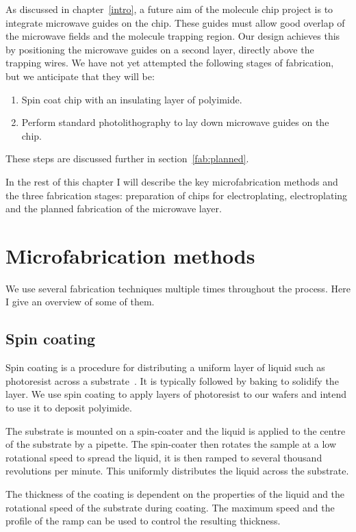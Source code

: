 As discussed in chapter~\ref{intro}, a future aim of the molecule chip project is to
integrate microwave guides on the chip. These guides must allow good overlap of
the microwave fields and the molecule trapping region. Our design achieves this
by positioning the microwave guides on a second layer, directly above the
trapping wires. We have not yet attempted the following stages of
fabrication, but we anticipate that they will be:
\begin{enumerate}[resume]
    \item Spin coat chip with an insulating layer of polyimide.
    \item Perform standard photolithography to lay down microwave guides on the
      chip.
\end{enumerate}
These steps are discussed further in section~\ref{fab:planned}.

In the rest of this chapter I will describe the key microfabrication methods
and the three fabrication stages: preparation of chips for electroplating,
electroplating and the planned fabrication of the microwave layer.

\section{Microfabrication methods}

We use several fabrication techniques multiple times throughout the process.
Here I give an overview of some of them.

\subsection{Spin coating}
\label{fab:spin}

Spin coating is a procedure for distributing a uniform layer of liquid such as
photoresist  across a substrate~\cite{Cohen2011}. It is typically followed by
baking to solidify the layer. We use spin coating to apply layers of
photoresist to our wafers and intend to use it to deposit polyimide.

The substrate is mounted on a spin-coater
%
%
and the liquid is applied to the centre of the substrate by a pipette. The
spin-coater then rotates the sample at a low rotational speed to spread the
liquid, it is then ramped to several thousand revolutions per minute.
This uniformly distributes the liquid across the substrate.

The thickness of the coating is dependent on the properties of the liquid
 and the rotational speed of the substrate during coating.
The maximum speed and the profile of the ramp can be used to control the
resulting thickness.

